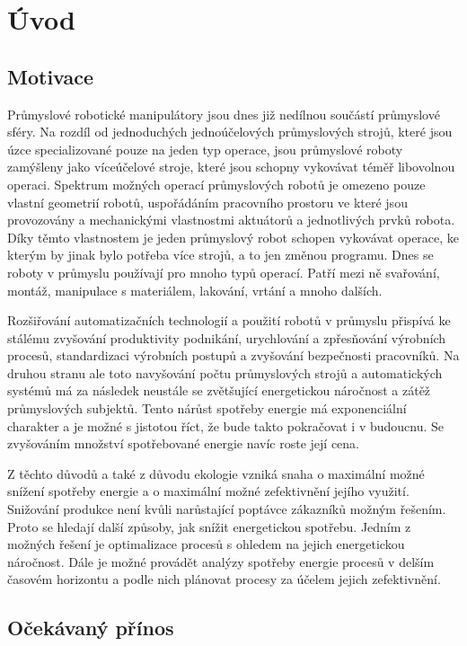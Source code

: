 

\chapter{Úvod}

\section{Motivace}

Průmyslové robotické manipulátory jsou dnes již nedílnou součástí průmyslové sféry. Na rozdíl od jednoduchých jednoúčelových průmyslových strojů, které jsou úzce specializované pouze na jeden typ operace, jsou průmyslové roboty zamýšleny jako víceúčelové stroje, které jsou schopny vykovávat téměř libovolnou operaci. Spektrum možných operací průmyslových robotů je omezeno pouze vlastní geometrií robotů, uspořádáním pracovního prostoru ve které jsou provozovány a mechanickými vlastnostmi aktuátorů a jednotlivých prvků robota. Díky těmto vlastnostem je jeden průmyslový robot schopen vykovávat operace, ke kterým by jinak bylo potřeba více strojů, a to jen změnou programu. Dnes se roboty v průmyslu používají pro mnoho typů operací. Patří mezi ně svařování, montáž, manipulace s materiálem, lakování, vrtání a mnoho dalších.

Rozšiřování automatizačních technologií a použití robotů v průmyslu přispívá ke stálému zvyšování produktivity podnikání, urychlování a zpřesňování výrobních procesů, standardizaci výrobních postupů a zvyšování bezpečnosti pracovníků. Na druhou stranu ale toto navyšování počtu průmyslových strojů a automatických systémů má za následek neustále se zvětšující energetickou náročnost a zátěž průmyslových subjektů. Tento nárůst spotřeby energie má exponenciální charakter a je možné s jistotou říct, že bude takto pokračovat i v budoucnu.
Se zvyšováním množství spotřebované energie navíc roste její cena.

Z těchto důvodů a také z důvodu ekologie vzniká snaha o maximální možné snížení spotřeby energie a o maximální možné zefektivnění jejího využití. Snižování produkce není kvůli narůstající poptávce zákazníků možným řešením. Proto se hledají další způsoby, jak snížit energetickou spotřebu. Jedním z možných řešení je optimalizace procesů s ohledem na jejich energetickou náročnost. Dále je možné provádět analýzy spotřeby energie procesů v delším časovém horizontu a podle nich plánovat procesy za účelem jejich zefektivnění.

\section{Očekávaný přínos}


